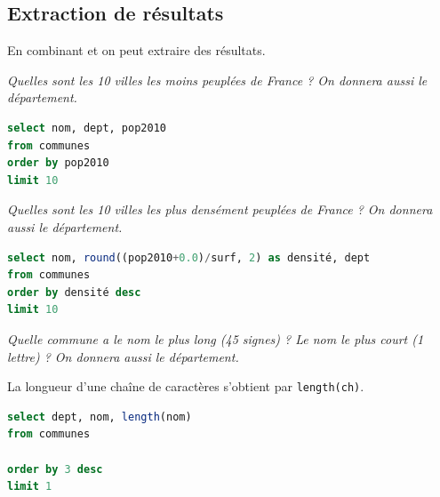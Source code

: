 \subsection{Extraction de résultats}
En combinant  et  on peut extraire des résultats.
\begin{Exercise}
\it Quelles sont les 10 villes les moins peuplées de France ? On donnera aussi le département.
\end{Exercise}
\begin{Answer}
\begin{lstlisting}[language=SQL]
select nom, dept, pop2010
from communes  
order by pop2010
limit 10
\end{lstlisting}
\end{Answer}
\begin{Exercise}
\it Quelles sont les 10 villes les plus densément peuplées de France ?  On donnera aussi le département.
\end{Exercise}
\begin{Answer}
\begin{lstlisting}[language=SQL]
select nom, round((pop2010+0.0)/surf, 2) as densité, dept
from communes  
order by densité desc
limit 10
\end{lstlisting}
\end{Answer}
\begin{Exercise}\it 
Quelle commune a le nom le plus long (45 signes) ? Le nom le plus court (1 lettre) ?
On donnera aussi le département.

La longueur d'une chaîne de caractères s'obtient par {\tt length(ch)}.
\end{Exercise}
\begin{Answer}
\begin{lstlisting}[language=SQL]
select dept, nom, length(nom)
from communes

order by 3 desc
limit 1
\end{lstlisting}
\end{Answer}
